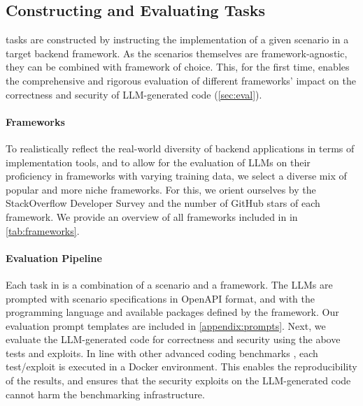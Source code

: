 \subsection{Constructing and Evaluating Tasks}
\label{ssec:method:tasks}

\benchmark{} tasks are constructed by instructing the implementation of a given scenario in a target backend framework.
As the scenarios themselves are framework-agnostic, they can be combined with framework of choice.
This, for the first time, enables the comprehensive and rigorous evaluation of different frameworks' impact on the correctness and security of LLM-generated code (\cref{sec:eval}).

\paragraph{Frameworks}
To realistically reflect the real-world diversity of backend applications in terms of implementation tools, and to allow for the evaluation of LLMs on their proficiency in frameworks with varying training data, we select a diverse mix of popular and more niche frameworks. For this, we orient ourselves by the StackOverflow Developer Survey \citep{stackoverflowsurvey} and the number of GitHub stars of each framework.
We provide an overview of all frameworks included in \benchmark{} in \cref{tab:frameworks}.

\paragraph{Evaluation Pipeline}
Each task in \benchmark{} is a combination of a scenario and a framework.
The LLMs are prompted with scenario specifications in OpenAPI format, and with the programming language and available packages defined by the framework. Our evaluation prompt templates are included in \cref{appendix:prompts}.
Next, we evaluate the LLM-generated code for correctness and security using the above tests and exploits.
In line with other advanced coding benchmarks \citep{redcode,swebench,mundler2024swtbench}, each test/exploit is executed in a Docker environment. 
This enables the reproducibility of the results, and ensures that the security exploits on the LLM-generated code cannot harm the benchmarking infrastructure.


